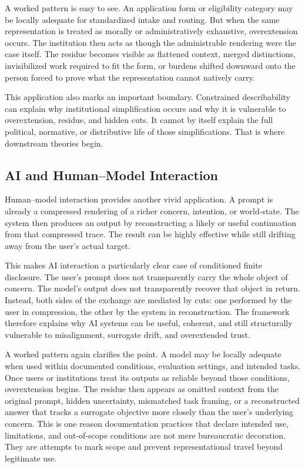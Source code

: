 \documentclass[11pt]{article}
\begin{document}
A worked pattern is easy to see. An application form or eligibility category may be locally adequate for standardized intake and routing. But when the same representation is treated as morally or administratively exhaustive, overextension occurs. The institution then acts as though the administrable rendering were the case itself. The residue becomes visible as flattened context, merged distinctions, invisibilized work required to fit the form, or burdens shifted downward onto the person forced to prove what the representation cannot natively carry. \cite{scott_seeing_like_a_state,star_ethnography_of_infrastructure,bowker_star_sorting_things_out,herd_moynihan_administrative_burden}

This application also marks an important boundary. Constrained describability can explain why institutional simplification occurs and why it is vulnerable to overextension, residue, and hidden cuts. It cannot by itself explain the full political, normative, or distributive life of those simplifications. That is where downstream theories begin.

\subsection{AI and Human--Model Interaction}

Human--model interaction provides another vivid application. A prompt is already a compressed rendering of a richer concern, intention, or world-state. The system then produces an output by reconstructing a likely or useful continuation from that compressed trace. The result can be highly effective while still drifting away from the user's actual target. \cite{mitchell_model_cards,gebru_datasheets,nist_ai_rmf,nist_explainable_ai}

This makes AI interaction a particularly clear case of conditioned finite disclosure. The user's prompt does not transparently carry the whole object of concern. The model's output does not transparently recover that object in return. Instead, both sides of the exchange are mediated by cuts: one performed by the user in compression, the other by the system in reconstruction. The framework therefore explains why AI systems can be useful, coherent, and still structurally vulnerable to misalignment, surrogate drift, and overextended trust. \cite{mitchell_model_cards,gebru_datasheets,nist_ai_rmf,nist_explainable_ai}

A worked pattern again clarifies the point. A model may be locally adequate when used within documented conditions, evaluation settings, and intended tasks. Once users or institutions treat its outputs as reliable beyond those conditions, overextension begins. The residue then appears as omitted context from the original prompt, hidden uncertainty, mismatched task framing, or a reconstructed answer that tracks a surrogate objective more closely than the user's underlying concern. This is one reason documentation practices that declare intended use, limitations, and out-of-scope conditions are not mere bureaucratic decoration. They are attempts to mark scope and prevent representational travel beyond legitimate use. \cite{mitchell_model_cards,gebru_datasheets,nist_ai_rmf,nist_explainable_ai}
\end{document}
